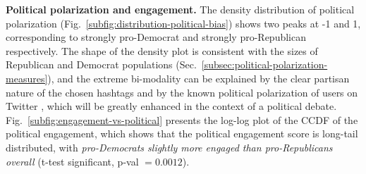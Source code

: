 \textbf{Political polarization and engagement.}
The density distribution of political polarization (Fig.~\ref{subfig:distribution-political-bias}) shows two peaks at -1 and 1, corresponding to strongly pro-Democrat and strongly pro-Republican respectively. 
The shape of the density plot is consistent with the sizes of Republican and Democrat populations (Sec.~\ref{subsec:political-polarization-measures}), and the extreme bi-modality can be explained by the clear partisan nature of the chosen hashtags and by the known political polarization of users on Twitter \cite{conover.2011,barbera.2015}, which will be greatly enhanced in the context of a political debate.
Fig.~\ref{subfig:engagement-vs-political} presents the log-log plot of the CCDF of the political engagement, which shows that the political engagement score is long-tail distributed, with \emph{pro-Democrats slightly more engaged than pro-Republicans overall} (t-test significant, p-val $ = 0.0012$).


